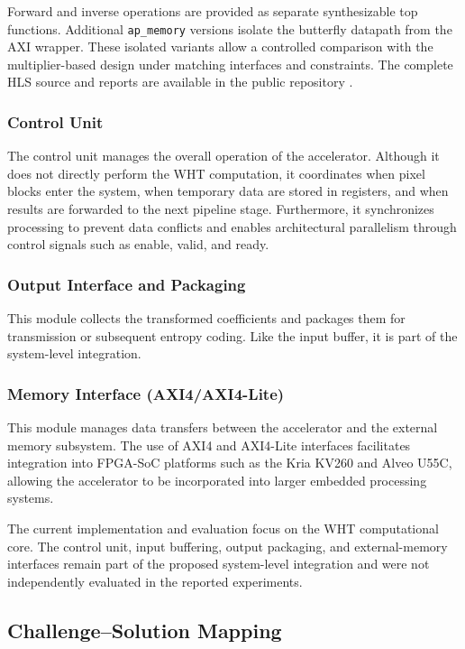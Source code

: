 \documentclass[conference]{IEEEtran}
\begin{document}
Forward and inverse operations are provided as separate synthesizable top functions. Additional \texttt{ap\_memory} versions isolate the butterfly datapath from the AXI wrapper. These isolated variants allow a controlled comparison with the multiplier-based design under matching interfaces and constraints. The complete HLS source and reports are available in the public repository \cite{repo_grupo5}.

\subsubsection{Control Unit}

The control unit manages the overall operation of the accelerator. Although it does not directly perform the WHT computation, it coordinates when pixel blocks enter the system, when temporary data are stored in registers, and when results are forwarded to the next pipeline stage. Furthermore, it synchronizes processing to prevent data conflicts and enables architectural parallelism through control signals such as enable, valid, and ready.

\subsubsection{Output Interface and Packaging}

This module collects the transformed coefficients and packages them for transmission or subsequent entropy coding. Like the input buffer, it is part of the system-level integration.

\subsubsection{Memory Interface (AXI4/AXI4-Lite)}

This module manages data transfers between the accelerator and the external memory subsystem. The use of AXI4 and AXI4-Lite interfaces facilitates integration into FPGA-SoC platforms such as the Kria KV260 and Alveo U55C, allowing the accelerator to be incorporated into larger embedded processing systems.

The current implementation and evaluation focus on the WHT computational core. The control unit, input buffering, output packaging, and external-memory interfaces remain part of the proposed system-level integration and were not independently evaluated in the reported experiments.

\subsection{Challenge--Solution Mapping}
\end{document}
